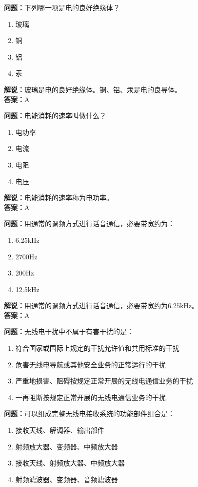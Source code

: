 \documentclass{ctexbook}%
\begin{document}
\textbf{问题：}下列哪一项是电的良好绝缘体？
\begin{enumerate}[label=\Alph*), leftmargin=3em]
\item 玻璃
\item 铜
\item 铝
\item 汞
\end{enumerate}
\textbf{解说：}玻璃是电的良好绝缘体。铜、铝、汞是电的良导体。\\
\textbf{答案：}A

\textbf{问题：}电能消耗的速率叫做什么？
\begin{enumerate}[label=\Alph*), leftmargin=3em]
\item 电功率
\item 电流
\item 电阻
\item 电压
\end{enumerate}
\textbf{解说：}电能消耗的速率称为电功率。\\
\textbf{答案：}A

\textbf{问题：}用通常的调频方式进行话音通信，必要带宽约为：
\begin{enumerate}[label=\Alph*), leftmargin=3em]
\item 6.25kHz
\item 2700Hz
\item 200Hz
\item 12.5kHz
\end{enumerate}
\textbf{解说：}用通常的调频方式进行话音通信，必要带宽约为6.25kHz。\\
\textbf{答案：}A

\textbf{问题：}无线电干扰中不属于有害干扰的是：
\begin{enumerate}[label=\Alph*), leftmargin=3em]
\item 符合国家或国际上规定的干扰允许值和共用标准的干扰
\item 危害无线电导航或其他安全业务的正常运行的干扰
\item 严重地损害、阻碍按规定正常开展的无线电通信业务的干扰
\item 一再阻断按规定正常开展的无线电通信业务的干扰
\end{enumerate}

\textbf{问题：}可以组成完整无线电接收系统的功能部件组合是：
\begin{enumerate}[label=\Alph*), leftmargin=3em]
\item 接收天线、解调器、输出部件
\item 射频放大器、变频器、中频放大器
\item 接收天线、射频放大器、中频放大器
\item 射频滤波器、变频器、音频滤波器
\end{enumerate}
\end{document}
